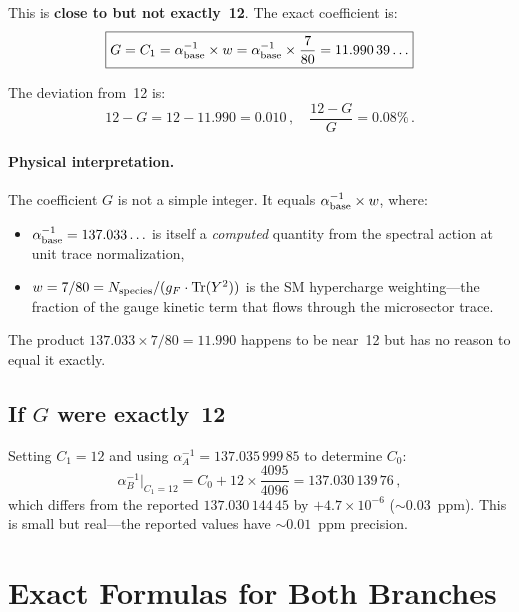 \documentclass[12pt,a4paper]{article}
\begin{document}
This is \textbf{close to but not exactly~12}. The exact coefficient is:
\begin{equation}
\boxed{G = C_1 = \alpha^{-1}_{\rm base} \times w
= \alpha^{-1}_{\rm base} \times \frac{7}{80}
= 11.990\,39\ldots}
\end{equation}

The deviation from~12 is:
\begin{equation}
12 - G = 12 - 11.990 = 0.010\,,\quad \frac{12 - G}{G} = 0.08\%\,.
\end{equation}

\paragraph{Physical interpretation.}
The coefficient $G$ is not a simple integer. It equals
$\alpha^{-1}_{\rm base} \times w$, where:
\begin{itemize}
\item $\alpha^{-1}_{\rm base} = 137.033\ldots$ is itself a \emph{computed}
  quantity from the spectral action at unit trace normalization,
\item $w = 7/80 = N_{\rm species}/(g_F \cdot \mathrm{Tr}(Y^2))$ is the
  SM hypercharge weighting---the fraction of the gauge kinetic term that
  flows through the microsector trace.
\end{itemize}
The product $137.033 \times 7/80 = 11.990$ happens to be near~12 but has no
reason to equal it exactly.

\subsection{If $G$ were exactly~12}

Setting $C_1 = 12$ and using $\alpha^{-1}_A = 137.035\,999\,85$ to
determine $C_0$:
\begin{equation}
\alpha^{-1}_B\big|_{C_1=12}
= C_0 + 12 \times \frac{4095}{4096}
= 137.030\,139\,76\,,
\end{equation}
which differs from the reported $137.030\,144\,45$ by $+4.7 \times 10^{-6}$
($\sim 0.03$~ppm). This is small but real---the reported values have
$\sim 0.01$~ppm precision.

\section{Exact Formulas for Both Branches}
\label{sec:exact}
\end{document}
